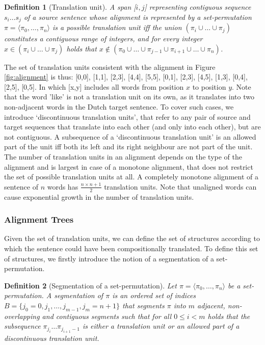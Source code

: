 \documentclass[a4paper, 11pt]{report}
\theoremstyle{definition}
\theoremstyle{plain}
\newtheorem{definition}{Definition}
\begin{document}
\begin{definition}[Translation unit]
A span [$i,j$] representing contiguous sequence $s_i\ldots s_j$ of a source sentence whose alignment is represented by a set-permutation $\pi = \langle\pi_0 ,\ldots ,\pi_n\rangle$ is a possible translation unit iff the union $(\pi_i\cup \ldots \cup \pi_j)$ constitutes a contiguous range of integers, and for every integer $x \in (\pi_i\cup \ldots \cup\pi_j)$ holds that  $x \notin (\pi_0\cup \ldots \cup \pi_{j-1} \cup \pi_{i+1}\cup\ldots\cup \pi_n)$.
\end{definition}

The set of translation units consistent with the alignment in Figure \ref{fig:alignment} is thus: {[0,0], [1,1], [2,3], [4,4], [5,5], [0,1], [2,3], [4,5], [1,3], [0,4], [2,5], [0,5]}. In which [x,y] includes all words from position $x$ to position $y$. Note that the word 'like' is not a translation unit on its own, as it translates into two non-adjacent words in the Dutch target sentence. To cover such cases, we introduce `discontinuous translation units', that refer to any pair of source and target sequences that translate into each other (and only into each other), but are not contiguous. A subsequence of a `discontinuous translation unit' is an allowed part of the unit iff both its left and its right neighbour are not part of the unit.\\
The number of translation units in an alignment depends on the type of the alignment and is largest in case of a monotone alignment, that does not restrict the set of possible translation units at all. A completely monotone alignment of a sentence of $n$ words has $\frac{n\times n+1}{2}$ translation units. Note that unaligned words can cause exponential growth in the number of translation units.

\subsubsection{Alignment Trees} Given the set of translation units, we can define the set of structures according to which the sentence could have been compositionally translated. To define this set of structures, we firstly introduce the notion of a segmentation of a set-permutation.

\begin{definition}[Segmentation of a set-permutation]
Let $\pi = \langle \pi_0, \ldots,\pi_n\rangle$ be a set-permutation. A segmentation of $\pi$ is an ordered set of indices $B = \{j_0 = 0, j_1, \ldots ,j_{m-1},j_m = n+1\}$ that segments $\pi$ into $m$ adjacent, non-overlapping and contiguous segments such that for all $0\leq i < m$ holds that the subsequence $\pi_{j_i}\ldots\pi_{j_{i+1}-1}$ is either a translation unit or an allowed part of a discontinuous translation unit.
\end{definition}
\end{document}
